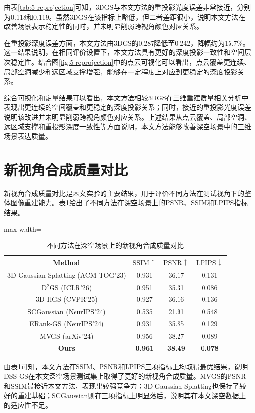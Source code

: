 由表\ref{tab:5-reprojection}可知，3DGS与本文方法的重投影光度误差非常接近，分别为0.118和0.119。虽然3DGS在该指标上略低，但二者差距很小，说明本文方法在改善场景表示稳定性的同时，并未明显削弱跨视角颜色对应关系。

在重投影深度误差方面，本文方法由3DGS的0.287降低至0.242，降幅约为15.7\%。这一结果说明，在相同评价设置下，本文方法具有更好的深度投影一致性和空间层次稳定性。结合图\ref{fig:5-reprojection}中的点云可视化可以看出，点云覆盖更连续、局部空洞减少和远区域支撑增强，能够在一定程度上对应到更稳定的深度投影关系。

综合可视化和定量结果可以看出，本文方法相较3DGS在三维重建质量相关分析中表现出更连续的空间覆盖和更稳定的深度投影关系；同时，接近的重投影光度误差说明该改进并未明显削弱跨视角颜色对应关系。上述结果从点云覆盖、局部空洞、远区域支撑和重投影深度一致性等方面说明，本文方法能够改善深空场景中的三维场景表达质量。

\section{新视角合成质量对比}
新视角合成质量对比是本文实验的主要结果，用于评价不同方法在测试视角下的整体图像重建能力。表\ref{tab:5-2}给出了不同方法在深空场景上的$\mathrm{PSNR}$、$\mathrm{SSIM}$和$\mathrm{LPIPS}$指标结果。

\begin{table}[H]
    \fontsize{10.5pt}{13.125pt}\selectfont
    \caption{不同方法在深空场景上的新视角合成质量对比}
    \centering\label{tab:5-2}
    \begin{adjustbox}{max width=\textwidth}
    \begin{tabular}{cccc}
        \toprule
        Method & $\mathrm{SSIM}\uparrow$ & $\mathrm{PSNR}\uparrow$ & $\mathrm{LPIPS}\downarrow$ \\
        \midrule
        3D Gaussian Splatting (ACM TOG’23) & 0.931 & 36.17 & 0.131 \\
        D$^2$GS (ICLR’26) & 0.951 & 35.31 & 0.086 \\
        3D-HGS (CVPR’25) & 0.927 & 36.16 & 0.136 \\
        SCGaussian (NeurIPS’24) & 0.535 & 21.91 & 0.548 \\
        ERank-GS (NeurIPS’24) & 0.931 & 35.85 & 0.129 \\
        MVGS (arXiv’24) & 0.956 & 38.27 & 0.089 \\
        \textbf{Ours} & \textbf{0.961} & \textbf{38.49} & \textbf{0.078} \\
        \bottomrule
    \end{tabular}
    \end{adjustbox}
\end{table}
由表\ref{tab:5-2}可知，本文方法在$\mathrm{SSIM}$、$\mathrm{PSNR}$和$\mathrm{LPIPS}$三项指标上均取得最优结果，说明DSS-GS在本文深空场景测试集上取得了更好的新视角合成质量。MVGS的$\mathrm{PSNR}$和$\mathrm{SSIM}$最接近本文方法，表现出较强竞争力；3D Gaussian Splatting也保持了较好的重建基础；SCGaussian则在三项指标上明显落后，说明其在本文深空数据上的适应性不足。

